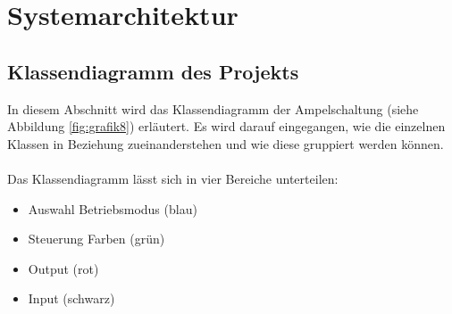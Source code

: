 \chapter{Systemarchitektur}
\section{Klassendiagramm des Projekts}

In diesem Abschnitt wird das Klassendiagramm der Ampelschaltung (siehe Abbildung \ref{fig:grafik8}) erläutert. Es wird darauf eingegangen, wie die einzelnen Klassen in Beziehung zueinanderstehen und wie diese gruppiert werden können.\\
\\
Das Klassendiagramm lässt sich in vier Bereiche unterteilen:\\

\begin{itemize}
	\item Auswahl Betriebsmodus (blau)
	\item Steuerung Farben (grün)
	\item Output (rot)
	\item Input (schwarz)\\
\end{itemize}

